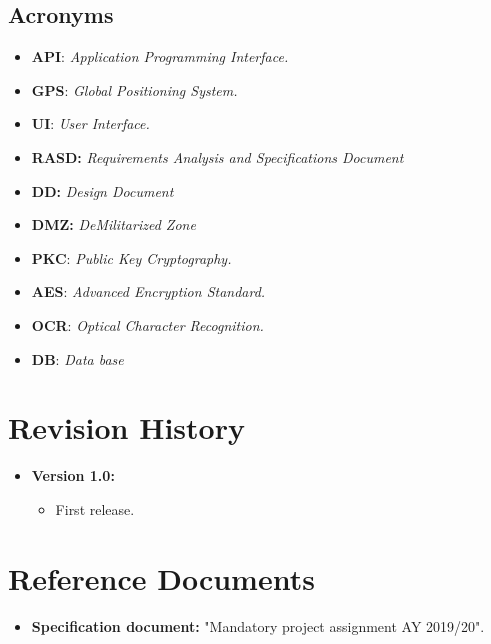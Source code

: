 \documentclass[12pt,a4paper]{report}
\begin{document}
			\subsection{Acronyms}
				\begin{itemize}
				\item \textbf{API}: \emph{Application Programming Interface.}
				\item \textbf{GPS}: \emph{Global Positioning System.}
				\item \textbf{UI}: \emph{User Interface.}
				\item \textbf{RASD:} \emph{Requirements Analysis and Specifications Document}
				\item \textbf{DD:} \emph{Design Document}
				\item \textbf{DMZ:} \emph{DeMilitarized Zone}
				\item \textbf{PKC}: \emph{Public Key Cryptography.}
				\item \textbf{AES}: \emph{Advanced Encryption Standard.}
				\item \textbf{OCR}: \emph{Optical Character Recognition.}
				\item \textbf{DB}: \emph{Data base}
				\end{itemize}
		\section{Revision History}
			\begin{itemize}
				\item \textbf{Version 1.0:}
				\begin{itemize}
					\item First release.
				\end{itemize}
			\end {itemize}
		\section{Reference Documents}
			\begin{itemize}
				\item \textbf{Specification document:} "Mandatory project assignment AY 2019/20".
			\end{itemize}
\end{document}

